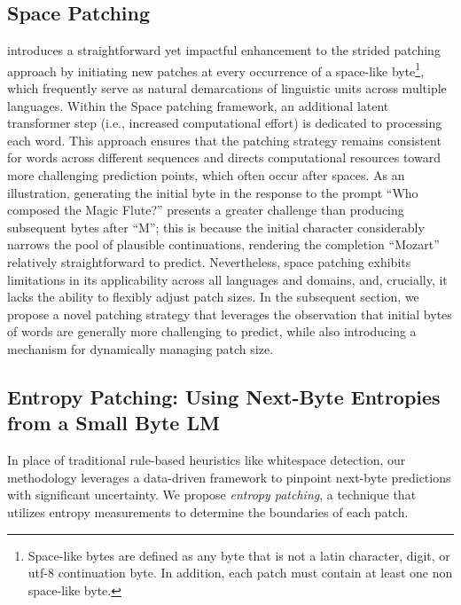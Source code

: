 \subsection{Space Patching}
\label{section:white-patch}

\citet{slagle2024spacebyte} introduces a straightforward yet impactful enhancement to the strided patching approach by initiating new patches at every occurrence of a space-like byte\footnote{
    Space-like bytes are defined as any byte that is not a latin character, digit, or utf-8 continuation byte. In addition, each patch must contain at least one non space-like byte. }, which frequently serve as natural demarcations of linguistic units across multiple languages. Within the Space patching framework, an additional latent transformer step (i.e., increased computational effort) is dedicated to processing each word. This approach ensures that the patching strategy remains consistent for words across different sequences and directs computational resources toward more challenging prediction points, which often occur after spaces. As an illustration, generating the initial byte in the response to the prompt ``Who composed the Magic Flute?\uline{\hspace{.6em}}'' presents a greater challenge than producing subsequent bytes after ``M''; this is because the initial character considerably narrows the pool of plausible continuations, rendering the completion ``Mozart'' relatively straightforward to predict. Nevertheless, space patching exhibits limitations in its applicability across all languages and domains, and, crucially, it lacks the ability to flexibly adjust patch sizes. In the subsequent section, we propose a novel patching strategy that leverages the observation that initial bytes of words are generally more challenging to predict, while also introducing a mechanism for dynamically managing patch size.

\subsection{Entropy Patching: Using Next-Byte Entropies from a Small Byte LM}
\label{section:dyn-patch}

In place of traditional rule-based heuristics like whitespace detection, our methodology leverages a data-driven framework to pinpoint next-byte predictions with significant uncertainty. We propose \textit{entropy patching}, a technique that utilizes entropy measurements to determine the boundaries of each patch.

